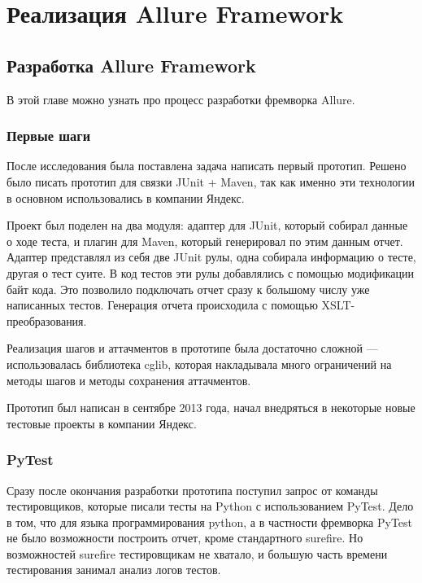 \chapter{Реализация Allure Framework} 
\label{chapter3}

\section{Разработка Allure Framework}

В этой главе можно узнать про процесс разработки фремворка Allure.

\subsection{Первые шаги}

После исследования была поставлена задача написать первый прототип. Решено было писать прототип для связки JUnit + Maven, так как именно эти технологии в основном использовались в компании Яндекс. 

Проект был поделен на два модуля: адаптер для JUnit, который собирал данные о ходе теста, и плагин для Maven, который генерировал по этим данным отчет. Адаптер представлял из себя две JUnit рулы, одна собирала информацию о тесте, другая о тест суите. В код тестов эти рулы добавлялись с помощью модификации байт кода. Это позволило подключать отчет сразу к большому числу уже написанных тестов. Генерация отчета происходила с помощью XSLT-преобразования. 

Реализация шагов и аттачментов в прототипе была достаточно сложной --- использовалась библиотека cglib, которая накладывала много ограничений на методы шагов и методы сохранения аттачментов.

Прототип был написан в сентябре 2013 года, начал внедряться в некоторые новые тестовые проекты в компании Яндекс.

\subsection{PyTest}

Сразу после окончания разработки прототипа поступил запрос от команды тестировщиков, которые писали тесты на Python с использованием PyTest. Дело в том, что для языка программирования python, а в частности фремворка PyTest не было возможности построить отчет, кроме стандартного surefire. Но возможностей surefire тестировщикам не хватало, и большую часть времени тестирования занимал анализ логов тестов.

